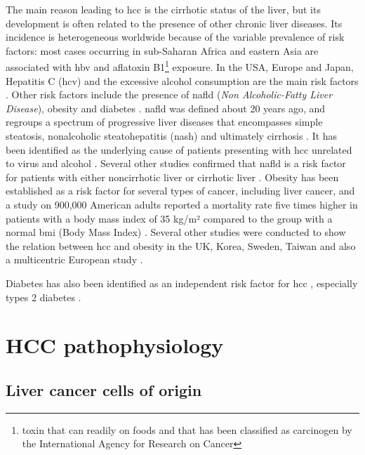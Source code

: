 The main reason leading to \ac{hcc} is the cirrhotic status of the
liver, but its development is often related to the presence of other
chronic liver diseases.
Its incidence is heterogeneous worldwide because of the variable
prevalence of risk factors: most cases occurring in sub-Saharan Africa
and eastern Asia are associated with \ac{hbv} and aflatoxin B1\footnote{toxin that can readily on foods and that has been classified as carcinogen by the International Agency for Research on Cancer}
exposure. In the USA, Europe and Japan, Hepatitis C (\ac{hcv}) and the
excessive alcohol consumption are the main risk factors \cite{Forner2018}. 
Other risk factors include the presence of \ac{nafld} (\emph{Non Alcoholic-Fatty Liver
Disease}), obesity and diabetes \cite{Marengo2016}. 
\ac{nafld} was defined about 20 years ago, and regroups a spectrum of
progressive liver diseases that encompasses simple steatosis,
nonalcoholic steatohepatitis (\ac{nash}) and ultimately cirrhosis
\cite{Marengo2016}. It has been identified as the
underlying cause of patients presenting with \ac{hcc} unrelated to
virus and alcohol \cite{Marrero2002}.
Several other studies confirmed that \ac{nafld} is a risk factor for
patients with either noncirrhotic liver \cite{Paradis2009, Dyson2014} or cirrhotic liver \cite{Wong2014, Ascha2010, Mittal2015}.
Obesity has been established as a risk factor for several types of
cancer, including liver cancer, and a study on 900,000 American adults
reported a mortality rate five times higher in patients with a body mass
index of 35 kg/m² compared to the group with a normal \ac{bmi} (Body Mass Index) \cite{Calle2003}. Several other studies were conducted to show
the relation between \ac{hcc} and obesity in the UK, Korea, Sweden, Taiwan
and also a multicentric European study \cite{Chen2008, Schlesinger2012, Samanic2006, Oh2005, Batty2005}.

Diabetes has also been identified as an independent risk factor for \ac{hcc}
\cite{Forner2018}, especially types 2 diabetes \cite{Noto2010,Wideroff1997,El-Serag2004,Davila2005,Inoue2006}.


\section{HCC pathophysiology}\label{hcc_pathophysiology}

\subsection{Liver cancer cells of origin}\label{cells-of-origin-of-liver-cancer}

